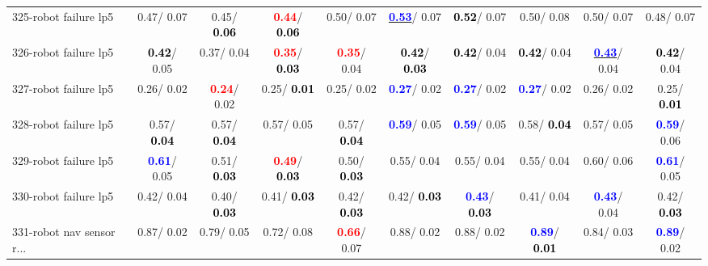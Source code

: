 \begin{table}[h]
\begin{center}
{\begin{tabular}{lc|c|c|c|c|c|c|c|c}
325-robot failure lp5 &   0.47/  0.07 &   0.45/\textcolor{black}{\textbf{  0.06}} & \textcolor{red}{\textbf{  0.44}}/\textcolor{black}{\textbf{  0.06}} &   0.50/  0.07 & \underline{\textcolor{blue}{\textbf{  0.53}}}/  0.07 & \textcolor{black}{\textbf{  0.52}}/  0.07 &   0.50/  0.08 &   0.50/  0.07 &   0.48/  0.07 \\
326-robot failure lp5 & \textcolor{black}{\textbf{  0.42}}/  0.05 &   0.37/  0.04 & \textcolor{red}{\textbf{  0.35}}/\textcolor{black}{\textbf{  0.03}} & \textcolor{red}{\textbf{  0.35}}/  0.04 & \textcolor{black}{\textbf{  0.42}}/\textcolor{black}{\textbf{  0.03}} & \textcolor{black}{\textbf{  0.42}}/  0.04 & \textcolor{black}{\textbf{  0.42}}/  0.04 & \underline{\textcolor{blue}{\textbf{  0.43}}}/  0.04 & \textcolor{black}{\textbf{  0.42}}/  0.04 \\
327-robot failure lp5 &   0.26/  0.02 & \textcolor{red}{\textbf{  0.24}}/  0.02 &   0.25/\textcolor{black}{\textbf{  0.01}} &   0.25/  0.02 & \textcolor{blue}{\textbf{  0.27}}/  0.02 & \textcolor{blue}{\textbf{  0.27}}/  0.02 & \textcolor{blue}{\textbf{  0.27}}/  0.02 &   0.26/  0.02 &   0.25/\textcolor{black}{\textbf{  0.01}} \\ \hline
328-robot failure lp5 &   0.57/\textcolor{black}{\textbf{  0.04}} &   0.57/\textcolor{black}{\textbf{  0.04}} &   0.57/  0.05 &   0.57/\textcolor{black}{\textbf{  0.04}} & \textcolor{blue}{\textbf{  0.59}}/  0.05 & \textcolor{blue}{\textbf{  0.59}}/  0.05 &   0.58/\textcolor{black}{\textbf{  0.04}} &   0.57/  0.05 & \textcolor{blue}{\textbf{  0.59}}/  0.06 \\
329-robot failure lp5 & \textcolor{blue}{\textbf{  0.61}}/  0.05 &   0.51/\textcolor{black}{\textbf{  0.03}} & \textcolor{red}{\textbf{  0.49}}/\textcolor{black}{\textbf{  0.03}} &   0.50/\textcolor{black}{\textbf{  0.03}} &   0.55/  0.04 &   0.55/  0.04 &   0.55/  0.04 &   0.60/  0.06 & \textcolor{blue}{\textbf{  0.61}}/  0.05 \\
330-robot failure lp5 &   0.42/  0.04 &   0.40/\textcolor{black}{\textbf{  0.03}} &   0.41/\textcolor{black}{\textbf{  0.03}} &   0.42/\textcolor{black}{\textbf{  0.03}} &   0.42/\textcolor{black}{\textbf{  0.03}} & \textcolor{blue}{\textbf{  0.43}}/\textcolor{black}{\textbf{  0.03}} &   0.41/  0.04 & \textcolor{blue}{\textbf{  0.43}}/  0.04 &   0.42/\textcolor{black}{\textbf{  0.03}} \\
331-robot nav sensor r... &   0.87/  0.02 &   0.79/  0.05 &   0.72/  0.08 & \textcolor{red}{\textbf{  0.66}}/  0.07 &   0.88/  0.02 &   0.88/  0.02 & \textcolor{blue}{\textbf{  0.89}}/\textcolor{black}{\textbf{  0.01}} &   0.84/  0.03 & \textcolor{blue}{\textbf{  0.89}}/  0.02 \\

\end{tabular}}
\end{center}
\end{table}
